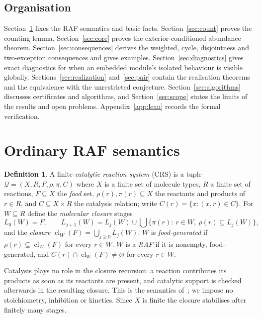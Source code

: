 \documentclass[11pt,a4paper]{article}
\theoremstyle{plain}
\theoremstyle{definition}
\newtheorem{definition}[theorem]{Definition}
\theoremstyle{remark}
\newcommand{\QQ}{\mathcal Q}
\newcommand{\cl}{\operatorname{cl}}
\begin{document}
\subsection{Organisation}

Section~\ref{sec:prelim} fixes the RAF semantics and basic facts. Section~\ref{sec:count}
proves the counting lemma. Section~\ref{sec:core} proves the exterior-conditioned abundance
theorem. Section~\ref{sec:consequences} derives the weighted, cycle, disjointness and
two-exception consequences and gives examples. Section~\ref{sec:diagnostics} gives exact
diagnostics for when an embedded module's isolated behaviour is visible globally.
Sections~\ref{sec:realization} and~\ref{sec:pair} contain the realisation theorems and the
equivalence with the unrestricted conjecture. Section~\ref{sec:algorithms} discusses
certificates and algorithms, and Section~\ref{sec:scope} states the limits of the results
and open problems. Appendix~\ref{app:lean} records the formal verification.

\section{Ordinary RAF semantics}\label{sec:prelim}

\begin{definition}\label{def:crs}
A finite \emph{catalytic reaction system} (CRS) is a tuple $\QQ=(X,R,F,\rho,\pi,C)$ where
$X$ is a finite set of molecule types, $R$ a finite set of reactions, $F\subseteq X$ the
\emph{food} set, $\rho(r),\pi(r)\subseteq X$ the reactants and products of $r\in R$, and
$C\subseteq X\times R$ the catalysis relation; write $C(r)=\{x:(x,r)\in C\}$.
For $W\subseteq R$ define the \emph{molecular closure} stages
\[
L_0(W)=F,\qquad
L_{j+1}(W)=L_j(W)\cup\bigcup\{\pi(r):\ r\in W,\ \rho(r)\subseteq L_j(W)\},
\]
and the \emph{closure} $\cl_W(F)=\bigcup_{j\ge0}L_j(W)$.
$W$ is \emph{food-generated} if $\rho(r)\subseteq\cl_W(F)$ for every $r\in W$.
$W$ is a \emph{RAF} if it is nonempty, food-generated, and $C(r)\cap\cl_W(F)\ne\varnothing$
for every $r\in W$.
\end{definition}

Catalysis plays no role in the closure recursion: a reaction contributes its products
as soon as its reactants are present, and catalytic support is checked afterwards in
the resulting closure. This is the semantics of~\cite{hordijk2004detecting,steel2023interior};
we impose no stoichiometry, inhibition or kinetics. Since $X$ is finite the closure
stabilises after finitely many stages.
\end{document}
